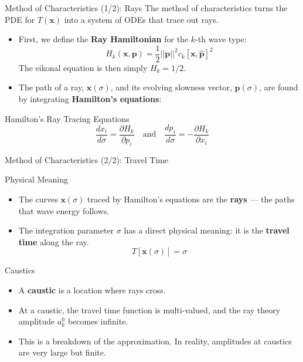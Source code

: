 \documentclass{beamer}
\begin{document}
\begin{frame}{Method of Characteristics (1/2): Rays}
    The method of characteristics turns the PDE for $T(\mathbf{x})$ into a system of ODEs that trace out rays.
    \begin{itemize}
        \item First, we define the \textbf{Ray Hamiltonian} for the $k$-th wave type:
        $$ H_{k}(\mathbf{x},\mathbf{p}) = \frac{1}{2}||\mathbf{p}||^{2}c_{k}[\mathbf{x},\hat{\mathbf{p}}]^{2} $$
        The eikonal equation is then simply $H_k = 1/2$.
        \pause
        \item The path of a ray, $\mathbf{x}(\sigma)$, and its evolving slowness vector, $\mathbf{p}(\sigma)$, are found by integrating \textbf{Hamilton's equations}:
    \end{itemize}
    \begin{alertblock}{Hamilton's Ray Tracing Equations}
        $$ \frac{d x_{i}}{d\sigma}=\frac{\partial H_{k}}{\partial p_{i}} \quad \text{and} \quad \frac{d p_{i}}{d\sigma}=-\frac{\partial H_{k}}{\partial x_{i}} $$
    \end{alertblock}
\end{frame}

\begin{frame}{Method of Characteristics (2/2): Travel Time}
    \begin{block}{Physical Meaning}
        \begin{itemize}
            \item The curves $\mathbf{x}(\sigma)$ traced by Hamilton's equations are the \textbf{rays} — the paths that wave energy follows.
            \pause
            \item The integration parameter $\sigma$ has a direct physical meaning: it is the \textbf{travel time} along the ray.
            $$ T[\mathbf{x}(\sigma)] = \sigma $$
        \end{itemize}
    \end{block}
    \pause
    \begin{block}{Caustics}
        \begin{itemize}
            \item A \textbf{caustic} is a location where rays cross.
            \pause
            \item At a caustic, the travel time function is multi-valued, and the ray theory amplitude $a_k^0$ becomes infinite.
            \pause
            \item This is a breakdown of the approximation. In reality, amplitudes at caustics are very large but finite.
        \end{itemize}
    \end{block}
\end{frame}
\end{document}
